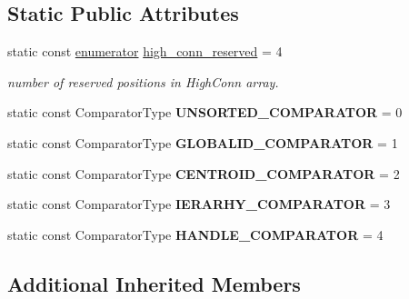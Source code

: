 \subsection*{Static Public Attributes}
\begin{DoxyCompactItemize}
\item 
static const \hyperlink{classINMOST_1_1Storage_ae333dfced6fa9cfde0c8e7dcf1b0cc2b}{enumerator} \hyperlink{classINMOST_1_1ElementSet_a2a6e9c51357ae2e322d1d63118df85b8}{high\-\_\-conn\-\_\-reserved} = 4
\begin{DoxyCompactList}\small\item\em number of reserved positions in High\-Conn array. \end{DoxyCompactList}\item 
\hypertarget{classINMOST_1_1ElementSet_a094cd1d3991fb611b9bfdcfc1373b589}{static const Comparator\-Type {\bfseries U\-N\-S\-O\-R\-T\-E\-D\-\_\-\-C\-O\-M\-P\-A\-R\-A\-T\-O\-R} = 0}\label{classINMOST_1_1ElementSet_a094cd1d3991fb611b9bfdcfc1373b589}

\item 
\hypertarget{classINMOST_1_1ElementSet_af8f036b8b6e777284877e95b6ffc9df5}{static const Comparator\-Type {\bfseries G\-L\-O\-B\-A\-L\-I\-D\-\_\-\-C\-O\-M\-P\-A\-R\-A\-T\-O\-R} = 1}\label{classINMOST_1_1ElementSet_af8f036b8b6e777284877e95b6ffc9df5}

\item 
\hypertarget{classINMOST_1_1ElementSet_a0bd06415bfef0096fed9a0e4ad4b4e50}{static const Comparator\-Type {\bfseries C\-E\-N\-T\-R\-O\-I\-D\-\_\-\-C\-O\-M\-P\-A\-R\-A\-T\-O\-R} = 2}\label{classINMOST_1_1ElementSet_a0bd06415bfef0096fed9a0e4ad4b4e50}

\item 
\hypertarget{classINMOST_1_1ElementSet_a7b52a3764ca783af88e51b9942e0106f}{static const Comparator\-Type {\bfseries I\-E\-R\-A\-R\-H\-Y\-\_\-\-C\-O\-M\-P\-A\-R\-A\-T\-O\-R} = 3}\label{classINMOST_1_1ElementSet_a7b52a3764ca783af88e51b9942e0106f}

\item 
\hypertarget{classINMOST_1_1ElementSet_ac2764455c0e4bb5e1220e01995221a79}{static const Comparator\-Type {\bfseries H\-A\-N\-D\-L\-E\-\_\-\-C\-O\-M\-P\-A\-R\-A\-T\-O\-R} = 4}\label{classINMOST_1_1ElementSet_ac2764455c0e4bb5e1220e01995221a79}

\end{DoxyCompactItemize}
\subsection*{Additional Inherited Members}


